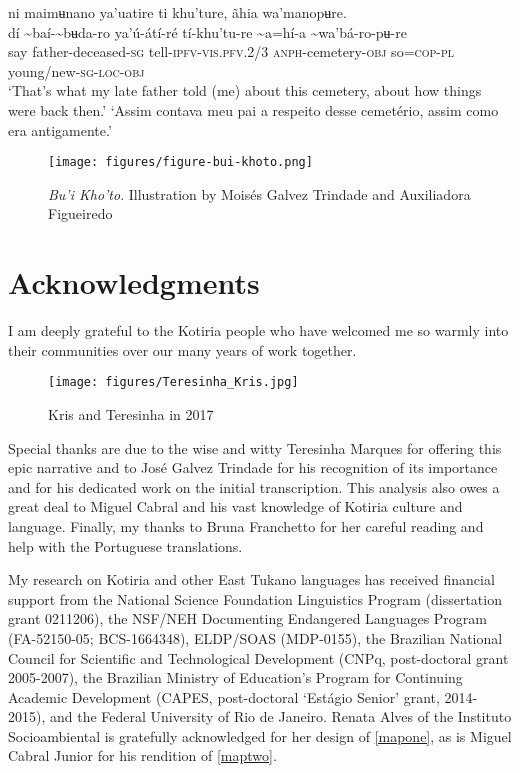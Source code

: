 \documentclass[output=paper,
modfonts,nonflat
]{langsci/langscibook}
\begin{document}
\ea ni maimʉnano ya'uatire ti khu'ture, ãhia wa'manopʉre. \\[.3em]
\gll {\textasciitilde}dí	{\textasciitilde}baí-{\textasciitilde}bʉda-ro	ya'ú-átí-ré	tí-khu'tu-re {\textasciitilde}a=hí-a	{\textasciitilde}wa'bá-ro-pʉ-re\\
     say	father-deceased\textsc{-sg}	tell-\textsc{ipfv-vis.pfv.}2/3	\textsc{anph}-cemetery\textsc{-obj} so=\textsc{cop-pl}	young/new\textsc{-sg}\textsc{-loc}\textsc{-obj}\\
\glt ‘That's what my late father told (me) about this cemetery, about how things were back then.’
\glt ‘Assim contava meu pai a respeito desse cemetério, assim como era antigamente.’
\z 

\begin{figure}[t]
  \texttt{[image: figures/figure-bui-khoto.png]}
  \caption{\textit{Bu'i Kho'to}. Illustration by Moisés Galvez Trindade and Auxiliadora Figueiredo}
\end{figure}

\section*{Acknowledgments}

I am deeply grateful to the Kotiria people who have welcomed me so warmly into their communities over our many years of work together. 

\def\oldIntextsep{\the\intextsep}
\setlength{\intextsep}{0.25\baselineskip}
\begin{wrapfigure}{l}{6.3 cm}
  \texttt{[image: figures/Teresinha\_Kris.jpg]}
  \caption{Kris and Teresinha in 2017}
  \label{fig:kristeresinha}
\end{wrapfigure}
\setlength{\intextsep}{\oldIntextsep}

Special thanks are due to the wise and witty Teresinha Marques for offering this epic narrative and to José Galvez Trindade for his recognition of its importance and for his dedicated work on the initial transcription. This analysis also owes a great deal to Miguel Cabral and his vast knowledge of Kotiria culture and language. Finally, my thanks to Bruna Franchetto for her careful reading and help with the Portuguese translations.

 
\newpage  
My research on Kotiria and other East Tukano languages has received financial support from 
the National Science Foundation Linguistics Program (dissertation grant 0211206), 
the NSF/NEH Documenting Endangered Languages Program (FA-52150-05; BCS-1664348), 
ELDP/SOAS (MDP-0155), 
the Brazilian National Council for Scientific and Technological Development (CNPq, post-doctoral grant 2005-2007),
the Brazilian Ministry of Education’s Program for Continuing Academic Development (CAPES, post-doctoral ‘Estágio Senior' grant, 2014-2015), and 
the Federal University of Rio de Janeiro. 
Renata Alves of the Instituto Socioambiental is gratefully acknowledged for her design of \autoref{mapone}, as is Miguel Cabral Junior for his rendition of \autoref{maptwo}. 
\end{document}
